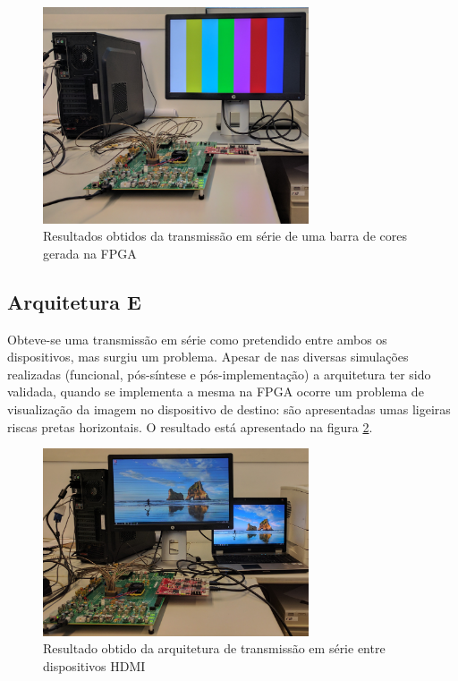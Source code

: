 \documentclass[11pt,a4paper]{article}
\begin{document}
	
	\begin{figure}[h!]
		\begin{center}
			\leavevmode
			\includegraphics[width=0.7\textwidth]{resultados_planoD}
			\caption[Resultados obtidos da transmissão em série de uma barra de cores gerada na FPGA]{Resultados obtidos da transmissão em série de uma barra de cores gerada na FPGA}
			\label{fig:planD_resultados}
		\end{center}
	\end{figure}
	\subsection{Arquitetura E}
	
	Obteve-se uma transmissão em série como pretendido entre ambos os dispositivos, mas surgiu um problema. Apesar de nas diversas simulações realizadas (funcional, pós-síntese e pós-implementação) a arquitetura ter sido validada, quando se implementa a mesma na FPGA ocorre um problema de visualização da imagem no dispositivo de destino: são apresentadas umas ligeiras riscas pretas horizontais. O resultado está apresentado na figura \ref{fig:planoE_results}.
	
	
	\begin{figure}
		\begin{center}
			\leavevmode
			\includegraphics[width=0.7\textwidth]{resultados_planoE}		
			\caption[Resultado obtido da arquitetura de transmissão em série entre dispositivos HDMI]{Resultado obtido da arquitetura de transmissão em série entre dispositivos HDMI}
			\label{fig:planoE_results}
		\end{center}
	\end{figure}
	
\end{document}
